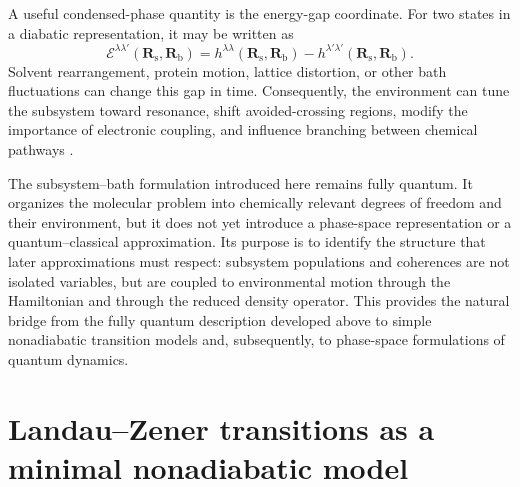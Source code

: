 \documentclass[
  11pt,
  letterpaper,
  onehalfspacing,
  normalmargins,
  equalmargins,
  oneside
]{ut-thesis}
\begin{document}
A useful condensed-phase quantity is the energy-gap coordinate. For two states
in a diabatic representation, it may be written as
\begin{equation}
\mathcal E^{\lambda\lambda'}
(\mathbf R_{\mathrm s},\mathbf R_{\mathrm b})
=
h^{\lambda\lambda}(\mathbf R_{\mathrm s},\mathbf R_{\mathrm b})
-
h^{\lambda'\lambda'}(\mathbf R_{\mathrm s},\mathbf R_{\mathrm b}) .
\label{eq:condensed-phase-energy-gap-coordinate}
\end{equation}
Solvent rearrangement, protein motion, lattice distortion, or other bath
fluctuations can change this gap in time. Consequently, the environment can
tune the subsystem toward resonance, shift avoided-crossing regions, modify
the importance of electronic coupling, and influence branching between
chemical pathways \cite{Marcus1993NobelLecture,Nitzan2006,MayKuhn2011}.

The subsystem--bath formulation introduced here remains fully quantum. It
organizes the molecular problem into chemically relevant degrees of freedom
and their environment, but it does not yet introduce a phase-space
representation or a quantum--classical approximation. Its purpose is to
identify the structure that later approximations must respect: subsystem
populations and coherences are not isolated variables, but are coupled to
environmental motion through the Hamiltonian and through the reduced density
operator. This provides the natural bridge from the fully quantum description
developed above to simple nonadiabatic transition models and, subsequently, to
phase-space formulations of quantum dynamics.

\section{Landau--Zener transitions as a minimal nonadiabatic model}
\label{sec:landau-zener}
\end{document}
